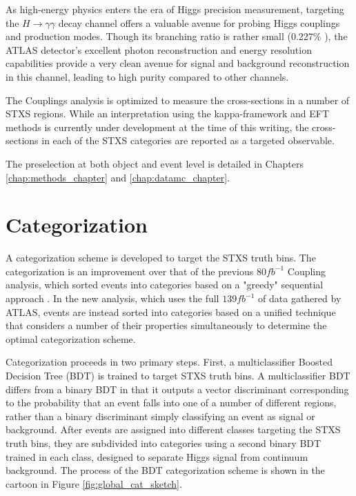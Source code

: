 
As high-energy physics enters the era of Higgs precision measurement, targeting the $H \rightarrow \gamma \gamma$ decay channel offers a valuable avenue for probing Higgs couplings and production modes. Though its branching ratio is rather small (0.227\% \cite{YellowReport4}), the ATLAS detector's excellent photon reconstruction and energy resolution capabilities provide a very clean avenue for signal and background reconstruction in this channel, leading to high purity compared to other channels.

The Couplings analysis is optimized to measure the cross-sections in a number of STXS regions. While an interpretation using the kappa-framework and EFT methods is currently under development at the time of this writing, the cross-sections in each of the STXS categories are reported as a targeted observable.

The preselection at both object and event level is detailed in Chapters \ref{chap:methods_chapter} and \ref{chap:datamc_chapter}.

\section{Categorization} \label{sec:Categorization} 

A categorization scheme is developed to target the STXS truth bins. The categorization is an improvement over that of the previous $80 fb^{-1}$ Coupling analysis, which sorted events into categories based on a "greedy" sequential approach \cite{couplings80fb}. In the new analysis, which uses the full $139 fb^{-1}$ of data gathered by ATLAS, events are instead sorted into categories based on a unified technique that considers a number of their properties simultaneously to determine the optimal categorization scheme.

Categorization proceeds in two primary steps. First, a multiclassifier Boosted Decision Tree (BDT) is trained to target STXS truth bins. A multiclassifier BDT differs from a binary BDT in that it outputs a vector discriminant corresponding to the probability that an event falls into one of a number of different regions, rather than a binary discriminant simply classifying an event as signal or background. After events are assigned into different classes targeting the STXS truth bins, they are subdivided into categories using a second binary BDT trained in each class, designed to separate Higgs signal from continuum background. The process of the BDT categorization scheme is shown in the cartoon in Figure \ref{fig:global_cat_sketch}.

